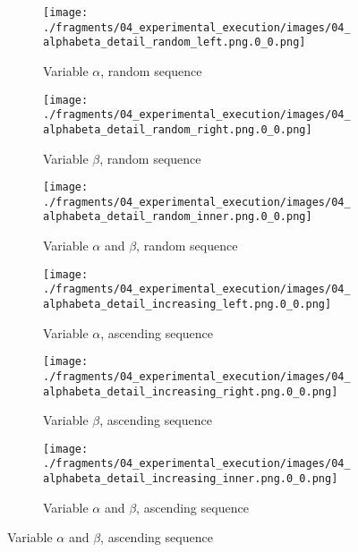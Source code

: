 \begin{figure}
    \centering
    \begin{subfigure}[b]{0.32\textwidth}
        \centering
        \texttt{[image: ./fragments/04\_experimental\_execution/images/04\_alphabeta\_detail\_random\_left.png.0\_0.png]}
        \caption{Variable $\alpha$, random sequence}
        \label{FIG:05_ALPHABETA_BENCHMARK_RANDOM_LEFT}
    \end{subfigure}
    \hfill
    \begin{subfigure}[b]{0.32\textwidth}
        \centering
        \texttt{[image: ./fragments/04\_experimental\_execution/images/04\_alphabeta\_detail\_random\_right.png.0\_0.png]}
        \caption{Variable $\beta$, random sequence}
        \label{FIG:05_ALPHABETA_BENCHMARK_RANDOM_RIGHT}
    \end{subfigure}
    \hfill
    \begin{subfigure}[b]{0.32\textwidth}
        \centering
        \texttt{[image: ./fragments/04\_experimental\_execution/images/04\_alphabeta\_detail\_random\_inner.png.0\_0.png]}
        \caption{Variable $\alpha$ and $\beta$, random sequence}
        \label{FIG:05_ALPHABETA_BENCHMARK_RANDOM_INNER}
    \end{subfigure}
    \vfill
    
    \centering
    \begin{subfigure}[b]{0.32\textwidth}
        \centering
        \texttt{[image: ./fragments/04\_experimental\_execution/images/04\_alphabeta\_detail\_increasing\_left.png.0\_0.png]}
        \caption{Variable $\alpha$, ascending sequence}
        \label{FIG:05_ALPHABETA_BENCHMARK_ASC_LEFT}
    \end{subfigure}
    \hfill
    \begin{subfigure}[b]{0.32\textwidth}
        \centering
        \texttt{[image: ./fragments/04\_experimental\_execution/images/04\_alphabeta\_detail\_increasing\_right.png.0\_0.png]}
        \caption{Variable $\beta$, ascending sequence}
        \label{FIG:05_ALPHABETA_BENCHMARK_ASC_RIGHT}
    \end{subfigure}
    \hfill
    \begin{subfigure}[b]{0.32\textwidth}
        \centering
        \texttt{[image: ./fragments/04\_experimental\_execution/images/04\_alphabeta\_detail\_increasing\_inner.png.0\_0.png]}
        \caption{Variable $\alpha$ and $\beta$, ascending sequence}
        \label{FIG:05_ALPHABETA_BENCHMARK_ASC_INNER}
    \end{subfigure}
    \vfill



\end{figure}
